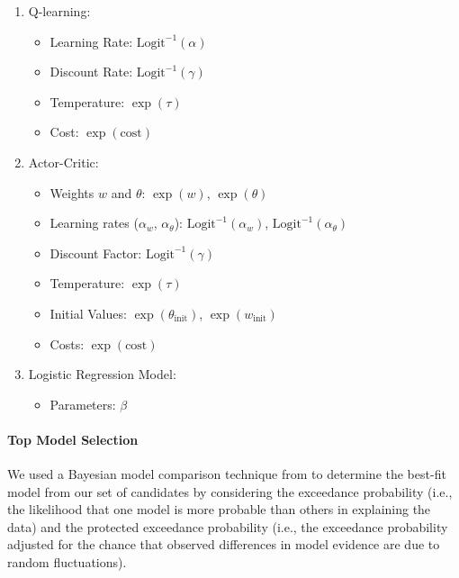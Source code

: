 \documentclass[
  number,
  preprint,
  3p,
  onecolumn]{elsarticle}
\let\oldparagraph\paragraph
\renewcommand{\paragraph}[1]{\oldparagraph{#1}\mbox{}}
\providecommand{\tightlist}{%
  \setlength{\itemsep}{0pt}\setlength{\parskip}{0pt}}\usepackage{longtable,booktabs,array}
\begin{document}
\begin{enumerate}
\def\labelenumi{\arabic{enumi}.}
\tightlist
\item
  Q-learning:

  \begin{itemize}
  \tightlist
  \item
    Learning Rate: \(\text{Logit}^{-1}(\alpha)\)
  \item
    Discount Rate: \(\text{Logit}^{-1}(\gamma)\)
  \item
    Temperature: \(\exp(\tau)\)
  \item
    Cost: \(\exp(\text{cost})\)
  \end{itemize}
\item
  Actor-Critic:

  \begin{itemize}
  \tightlist
  \item
    Weights \(w\) and \(\theta\): \(\exp(w)\), \(\exp(\theta)\)
  \item
    Learning rates (\(\alpha_w\), \(\alpha_\theta\)):
    \(\text{Logit}^{-1}(\alpha_w)\),
    \(\text{Logit}^{-1}(\alpha_\theta)\)
  \item
    Discount Factor: \(\text{Logit}^{-1}(\gamma)\)
  \item
    Temperature: \(\exp(\tau)\)
  \item
    Initial Values: \(\exp(\theta_{\text{init}})\),
    \(\exp(w_{\text{init}})\)
  \item
    Costs: \(\exp(\text{cost})\)
  \end{itemize}
\item
  Logistic Regression Model:

  \begin{itemize}
  \tightlist
  \item
    Parameters: \(\beta\)
  \end{itemize}
\end{enumerate}

\paragraph{Top Model Selection}\label{top-model-selection}

We used a Bayesian model comparison technique from \citep{piray2019a} to
determine the best-fit model from our set of candidates by considering
the exceedance probability (i.e., the likelihood that one model is more
probable than others in explaining the data) and the protected
exceedance probability (i.e., the exceedance probability adjusted for
the chance that observed differences in model evidence are due to random
fluctuations).
\end{document}
